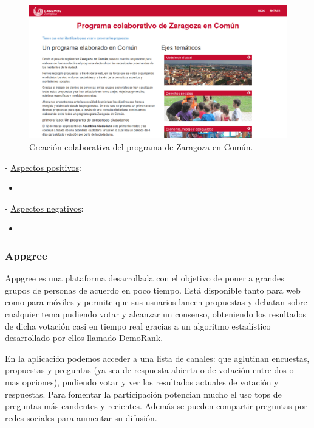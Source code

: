 \begin{figure}[H]
\centering
\includegraphics[keepaspectratio, scale=0.30]{Media/Captures/programaColaborativoGanemosZaragoza.png}
\caption{Creación colaborativa del programa de Zaragoza en Común.}
\label{fig:programaZaragozaEnComun}
\end{figure}

 - \underline{Aspectos positivos}:

\begin{itemize}
	\item 
\end{itemize}

 - \underline{Aspectos negativos}:

\begin{itemize}
	\item 
\end{itemize}

\subsubsection{Appgree}

Appgree\cite{ref:appgree} es una plataforma desarrollada con el objetivo de poner a grandes grupos de personas de acuerdo en poco tiempo. Está disponible tanto para web como para móviles y permite que sus usuarios lancen propuestas y debatan sobre cualquier tema pudiendo votar y alcanzar un consenso, obteniendo los resultados de dicha votación casi en tiempo real gracias a un algoritmo estadístico desarrollado por ellos llamado DemoRank\cite{ref:appgree_demoRank}.

En la aplicación podemos acceder a una lista de canales: que aglutinan encuestas, propuestas y preguntas (ya sea de respuesta abierta o de votación entre dos o mas opciones), pudiendo votar y ver los resultados actuales de votación y respuestas. Para fomentar la participación potencian mucho el uso tops de preguntas más candentes y recientes. Además se pueden compartir preguntas por redes sociales para aumentar su difusión.

